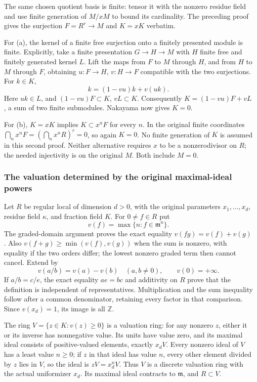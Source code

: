 The same chosen quotient basis is finite: tensor it with the nonzero residue field and use finite generation of \(M/xM\) to bound its cardinality. The preceding proof gives the surjection \(F=R^r\to M\) and \(K=xK\) verbatim.

For (a), the kernel of a finite free surjection onto a finitely presented module is finite. Explicitly, take a finite presentation \(G\to H\to M\) with \(H\) finite free and finitely generated kernel \(L\). Lift the maps from \(F\) to \(M\) through \(H\), and from \(H\) to \(M\) through \(F\), obtaining \(u:F\to H\), \(v:H\to F\) compatible with the two surjections. For \(k\in K\), \[
 k=(1-vu)k+v(uk).
\] Here \(uk\in L\), and \((1-vu)F\subset K\), \(vL\subset K\). Consequently \(K=(1-vu)F+vL\), a sum of two finite submodules. Nakayama now gives \(K=0\).

For (b), \(K=xK\) implies \(K\subset x^nF\) for every \(n\). In the original finite coordinates \(\bigcap_n x^nF=(\bigcap_n x^nR)^r=0\), so again \(K=0\). No finite generation of \(K\) is assumed in this second proof. Neither alternative requires \(x\) to be a nonzerodivisor on \(R\); the needed injectivity is on the original \(M\). Both include \(M=0\).

\subsubsection{The valuation determined by the original maximal-ideal powers}\label{algebra-proof-020-the-valuation-determined-by-the-original-maximal-ideal-powers}

Let \(R\) be regular local of dimension \(d>0\), with the original parameters \(x_1,\ldots,x_d\), residue field \(\kappa\), and fraction field \(K\). For \(0\ne f\in R\) put \[
 v(f)=\max\{n:f\in\mathfrak m^n\}.
\] The graded-domain argument proves the exact equality \(v(fg)=v(f)+v(g)\). Also \(v(f+g)\ge\min(v(f),v(g))\) when the sum is nonzero, with equality if the two orders differ; the lowest nonzero graded term then cannot cancel. Extend by \[
 v(a/b)=v(a)-v(b)\quad(a,b\ne0),\qquad v(0)=+\infty.
\] If \(a/b=c/e\), the exact equality \(ae=bc\) and additivity on \(R\) prove that the definition is independent of representatives. Multiplication and the sum inequality follow after a common denominator, retaining every factor in that comparison. Since \(v(x_d)=1\), its image is all \(\mathbb Z\).

The ring \(V=\{z\in K:v(z)\ge0\}\) is a valuation ring: for any nonzero \(z\), either it or its inverse has nonnegative value. Its units have value zero, and its maximal ideal consists of positive-valued elements, exactly \(x_dV\). Every nonzero ideal of \(V\) has a least value \(n\ge0\); if \(z\) in that ideal has value \(n\), every other element divided by \(z\) lies in \(V\), so the ideal is \(zV=x_d^nV\). Thus \(V\) is a discrete valuation ring with the actual uniformizer \(x_d\). Its maximal ideal contracts to \(\mathfrak m\), and \(R\subset V\).

